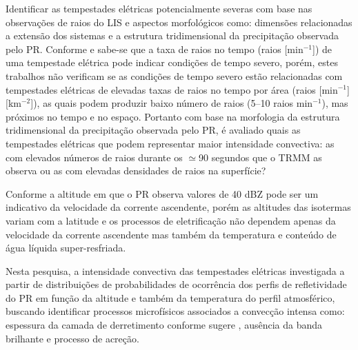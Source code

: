 
Identificar as tempestades elétricas potencialmente severas com base nas observações de raios do LIS e aspectos morfológicos como: dimensões relacionadas a extensão dos sistemas e a estrutura tridimensional da precipitação observada pelo PR. Conforme  e  sabe-se que a taxa de raios no tempo (raios [min$^{-1}$]) de uma tempestade elétrica pode indicar condições de tempo severo, porém, estes trabalhos não verificam se as condições de tempo severo estão relacionadas com tempestades elétricas de elevadas taxas de raios no tempo por área (raios [min$^{-1}$] [km$^{-2}$]), as quais podem produzir baixo número de raios (5--10 raios min$^{-1}$), mas próximos no tempo e no espaço. Portanto com base na morfologia da estrutura tridimensional da precipitação observada pelo PR, é avaliado quais as tempestades elétricas que podem representar maior intensidade convectiva: as com elevados números de raios durante os $\simeq$90 segundos que o TRMM as observa ou as com elevadas densidades de raios na superfície?


Conforme  a altitude em que o PR observa valores de 40 dBZ pode ser um indicativo da velocidade da corrente ascendente, porém as altitudes das isotermas variam com a latitude e os processos de eletrificação não dependem apenas da velocidade da corrente ascendente mas também da temperatura e conteúdo de água líquida super-resfriada. 


 Nesta pesquisa, a intensidade convectiva das tempestades elétricas investigada a partir de distribuições de probabilidades de ocorrência dos perfis de refletividade do PR em função da altitude e também da temperatura do perfil atmosférico, buscando identificar processos microfísicos associados a convecção intensa como: espessura da camada de derretimento conforme sugere , ausência da banda brilhante e processo de acreção.   



